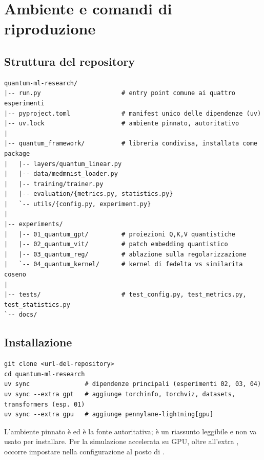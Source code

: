 \chapter{Ambiente e comandi di riproduzione}
\label{app:riproduzione}

\section{Struttura del repository}

\begin{lstlisting}[style=shell, numbers=none]
quantum-ml-research/
|-- run.py                      # entry point comune ai quattro esperimenti
|-- pyproject.toml              # manifest unico delle dipendenze (uv)
|-- uv.lock                     # ambiente pinnato, autoritativo
|
|-- quantum_framework/          # libreria condivisa, installata come package
|   |-- layers/quantum_linear.py
|   |-- data/medmnist_loader.py
|   |-- training/trainer.py
|   |-- evaluation/{metrics.py, statistics.py}
|   `-- utils/{config.py, experiment.py}
|
|-- experiments/
|   |-- 01_quantum_gpt/         # proiezioni Q,K,V quantistiche
|   |-- 02_quantum_vit/         # patch embedding quantistico
|   |-- 03_quantum_reg/         # ablazione sulla regolarizzazione
|   `-- 04_quantum_kernel/      # kernel di fedelta vs similarita coseno
|
|-- tests/                      # test_config.py, test_metrics.py, test_statistics.py
`-- docs/
\end{lstlisting}

\section{Installazione}

\begin{lstlisting}[style=shell, numbers=none]
git clone <url-del-repository>
cd quantum-ml-research
uv sync               # dipendenze principali (esperimenti 02, 03, 04)
uv sync --extra gpt   # aggiunge torchinfo, torchviz, datasets, transformers (esp. 01)
uv sync --extra gpu   # aggiunge pennylane-lightning[gpu]
\end{lstlisting}

L'ambiente pinnato è  ed è la fonte autoritativa;
 è un riassunto leggibile e non va usato per installare.
Per la simulazione accelerata su GPU, oltre all'extra , occorre
impostare  nella configurazione al posto di
.

